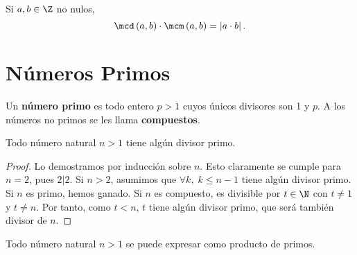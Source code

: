  \begin{ftheorem}[]
 \normalfont Si $\displaystyle a,b \in \Z $ no nulos,
 \[\mcd\left(a,b\right) \cdot \mcm\left(a,b\right) = \left|a \cdot b\right| .\]
 \end{ftheorem}

\section{Números Primos}

\begin{fdefinition}[]
\normalfont Un \textbf{número primo} es todo entero $\displaystyle p > 1 $ cuyos únicos divisores son 1 y $\displaystyle  p $. A los números no primos se les llama \textbf{compuestos}.
\end{fdefinition}

\begin{fprop}[]
\normalfont Todo número natural $\displaystyle n>1 $ tiene algún divisor primo.
\end{fprop}

\begin{proof}
Lo demostramos por inducción sobre $\displaystyle n $. Esto claramente se cumple para $\displaystyle n=2 $, pues $\displaystyle 2 | 2 $. Si $\displaystyle n >2 $, asumimos que $\displaystyle \forall k, \; k \leq n - 1 $ tiene algún divisor primo. Si $\displaystyle n $ es primo, hemos ganado. Si $\displaystyle n $ es compuesto, es divisible por $\displaystyle t \in \N $ con $\displaystyle t \neq 1 $ y $\displaystyle t \neq n $. Por tanto, como $\displaystyle t < n $, $\displaystyle t $ tiene algún divisor primo, que será también divisor de $\displaystyle n $.
\end{proof}

\begin{fprop}[]
\normalfont Todo número natural $\displaystyle n>1 $ se puede expresar como producto de primos.
\end{fprop}

